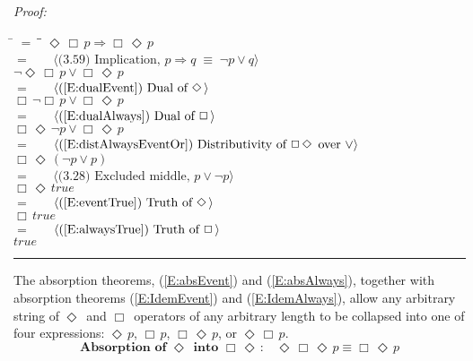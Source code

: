 \documentclass[fleqn, leqno]{article}
\newcommand{\lgap}{2pt}                             %
\newcommand{\mymathindent}{24pt}                    %
\newcommand{\equivs}{\ensuremath{\;\equiv\;}}       %
\newcommand{\impl}{\ensuremath{\Rightarrow}}        %
\newcommand{\Event}{\Diamond\,}
\newcommand{\Always}{\Box\,}
\newcommand{\myqed}{\rule[-.23ex]{1.2ex}{2.0ex}}
\newcommand{\myqedtab}{\hspace{388.5pt}}              %
\newcommand{\Gll} {\langle}                         %
\newcommand{\Ggg} {\rangle}                         %
\newcommand{\Hint}[1]     {\ \ \ $\Gll              \mbox{#1} \Ggg$ }   %
\begin{document}
\emph{Proof:}
\begin{tabbing}
\hspace{\mymathindent} \= $= \;$ \= \myqedtab \= \kill
  \> \>   $\Event\Always p \impl \Always\Event p$\\[\lgap]
  \> $=$  \>  \Hint{(3.59) Implication, $p\impl q \equivs \neg p \lor q$}\\[\lgap]
  \> \>   $\neg\Event\Always p \lor \Always\Event p$\\[\lgap]
  \> $=$  \>  \Hint{(\ref{E:dualEvent}) Dual of $\Event$}\\[\lgap]
  \> \>   $\Always\neg\Always p \lor \Always\Event p$\\[\lgap]  
  \> $=$  \>  \Hint{(\ref{E:dualAlways}) Dual of $\Always$}\\[\lgap]
  \> \>   $\Always\Event\neg p \lor \Always\Event p$\\[\lgap]
  \> $=$  \>  \Hint{(\ref{E:distAlwaysEventOr}) Distributivity of $\Always\Event$ over $\lor$}\\[\lgap]
  \> \>   $\Always\Event(\neg p \lor p)$\\[\lgap]
  \> $=$  \>  \Hint{(3.28) Excluded middle, $p\lor\neg p$}\\[\lgap]
  \> \>   $\Always\Event true$\\[\lgap]
  \> $=$  \>  \Hint{(\ref{E:eventTrue}) Truth of $\Event$}\\[\lgap]
  \> \>   $\Always true$\\[\lgap]
  \> $=$  \>  \Hint{(\ref{E:alwaysTrue}) Truth of $\Always$}\\[\lgap]
  \> \>   $true$ \> \myqed
\end{tabbing}

The absorption theorems, (\ref{E:absEvent}) and (\ref{E:absAlways}), together with absorption theorems
(\ref{E:IdemEvent}) and (\ref{E:IdemAlways}), allow any arbitrary string of $\Event$ and $\Always$ operators
of any arbitrary length to be collapsed into one of four expressions: \;$\Event p$, \;$\Always p$,
\;$\Always\Event p$, or \;$\Event\Always p$.
\begin{equation}\label{E:absEvent}
\textbf{Absorption of $\Event$ into $\Always\Event$:}\quad \Event\Always\Event p \equiv \Always\Event p
\end{equation}
\end{document}
